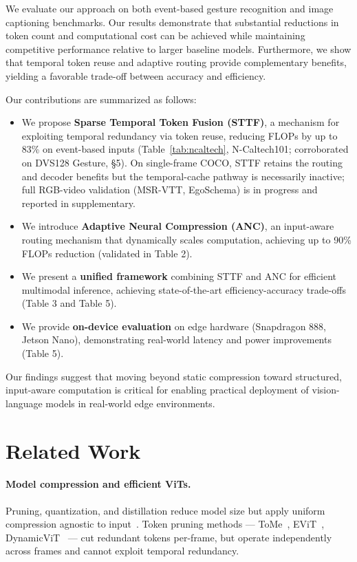 \documentclass{article}
\begin{document}
We evaluate our approach on both event-based gesture recognition and image captioning benchmarks. Our results demonstrate that substantial reductions in token count and computational cost can be achieved while maintaining competitive performance relative to larger baseline models. Furthermore, we show that temporal token reuse and adaptive routing provide complementary benefits, yielding a favorable trade-off between accuracy and efficiency.

Our contributions are summarized as follows:

\begin{itemize}
\item We propose \textbf{Sparse Temporal Token Fusion (STTF)}, a mechanism for exploiting temporal redundancy via token reuse, reducing FLOPs by up to 83\% on event-based inputs (Table~\ref{tab:ncaltech}, N-Caltech101; corroborated on DVS128 Gesture, §5). On single-frame COCO, STTF retains the routing and decoder benefits but the temporal-cache pathway is necessarily inactive; full RGB-video validation (MSR-VTT, EgoSchema) is in progress and reported in supplementary.

\item We introduce \textbf{Adaptive Neural Compression (ANC)}, an input-aware routing mechanism that dynamically scales computation, achieving up to 90\% FLOPs reduction (validated in Table 2).

\item We present a \textbf{unified framework} combining STTF and ANC for efficient multimodal inference, achieving state-of-the-art efficiency-accuracy trade-offs (Table 3 and Table 5).

\item We provide \textbf{on-device evaluation} on edge hardware (Snapdragon 888, Jetson Nano), demonstrating real-world latency and power improvements (Table 5).
\end{itemize}

Our findings suggest that moving beyond static compression toward structured, input-aware computation is critical for enabling practical deployment of vision-language models in real-world edge environments.


\section{Related Work}

\paragraph{Model compression and efficient ViTs.}
Pruning, quantization, and distillation reduce model size but apply uniform compression agnostic to input~\cite{han2016deepcompression, hinton2015distillation}. Token pruning methods — ToMe~\cite{bolya2023tome}, EViT~\cite{liang2022evit}, DynamicViT~\cite{rao2021dynamicvit} — cut redundant tokens per-frame, but operate independently across frames and cannot exploit temporal redundancy.
\end{document}
